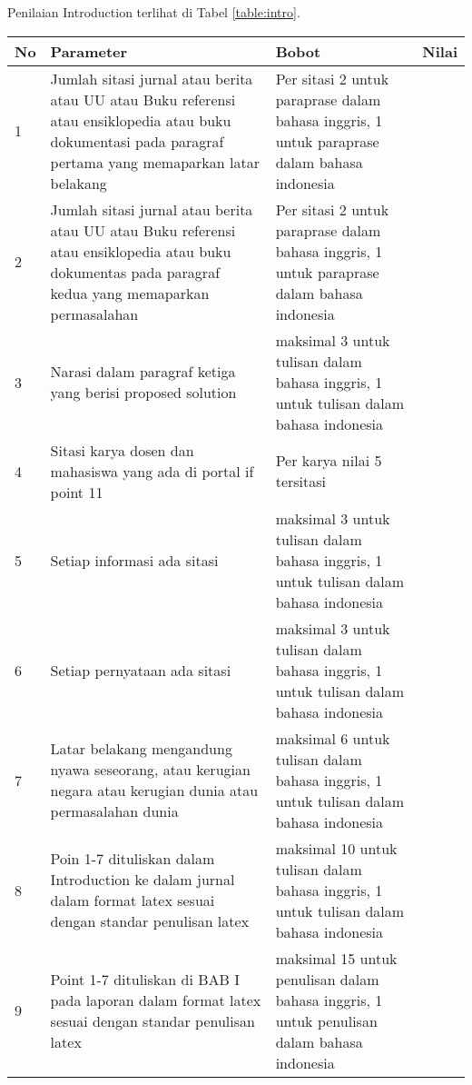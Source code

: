 Penilaian Introduction terlihat di Tabel \ref{table:intro}.
\begin{longtable}{|p{}|p{}|p{}|p{}|}
\hline
No&Parameter&Bobot&Nilai\\
\hline

1 &Jumlah sitasi jurnal atau berita atau UU atau Buku referensi atau ensiklopedia atau buku dokumentasi pada paragraf  pertama yang memaparkan latar belakang&Per sitasi 2 untuk paraprase dalam bahasa inggris, 1 untuk paraprase dalam bahasa indonesia& \\ \hline

2 &Jumlah sitasi jurnal atau berita atau UU atau Buku referensi atau ensiklopedia atau buku dokumentas pada paragraf  kedua yang memaparkan permasalahan&Per sitasi 2 untuk paraprase dalam bahasa inggris, 1 untuk paraprase dalam bahasa indonesia& \\ \hline

3 &Narasi dalam paragraf ketiga yang berisi proposed solution&maksimal 3 untuk tulisan dalam bahasa inggris, 1 untuk tulisan dalam bahasa indonesia& \\ \hline

4 &Sitasi karya dosen dan mahasiswa yang ada di portal if point 11&Per karya nilai 5 tersitasi& \\ \hline

5 &Setiap informasi ada sitasi&maksimal 3 untuk tulisan dalam bahasa inggris, 1 untuk tulisan dalam bahasa indonesia& \\ \hline

6 &Setiap pernyataan ada sitasi&maksimal 3 untuk tulisan dalam bahasa inggris, 1 untuk tulisan dalam bahasa indonesia& \\ \hline

7 &Latar belakang mengandung nyawa seseorang, atau kerugian negara atau kerugian dunia atau permasalahan dunia&maksimal 6 untuk tulisan dalam bahasa inggris, 1 untuk tulisan dalam bahasa indonesia& \\ \hline

8 &Poin 1-7 dituliskan dalam Introduction ke dalam jurnal dalam format latex sesuai dengan standar penulisan latex&maksimal 10 untuk tulisan dalam bahasa inggris, 1 untuk tulisan dalam bahasa indonesia& \\ \hline

9 &Point 1-7 dituliskan di BAB I pada laporan dalam format latex sesuai dengan standar penulisan latex&maksimal 15 untuk penulisan dalam bahasa inggris, 1 untuk penulisan dalam bahasa indonesia& \\ \hline



\end{longtable}
